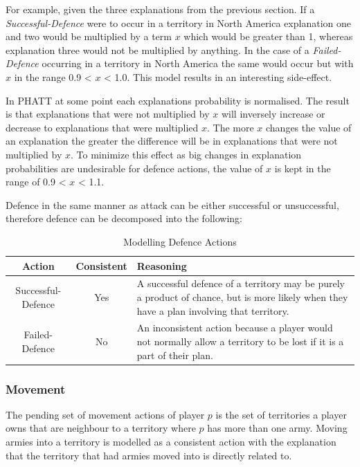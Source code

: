 \documentclass[parskip]{cs4rep}
\begin{document}
For example, given the three explanations from the previous section. If a \textit{Successful-Defence} were to occur in a territory in North America explanation one and two would be multiplied by a term $x$ which would be greater than 1, whereas explanation three would not be multiplied by anything. In the case of a \textit{Failed-Defence} occurring in a territory in North America the same would occur but with $x$ in the range 0.9 < $x$ < 1.0. This model results in an interesting side-effect.

In PHATT at some point each explanations probability is normalised. The result is that explanations that were not multiplied by $x$ will inversely increase or decrease to explanations that were multiplied $x$. The more $x$ changes the value of an explanation the greater the difference will be in explanations that were not multiplied by $x$. To minimize this effect as big changes in explanation probabilities are undesirable for defence actions, the value of $x$ is kept in the range of 0.9 < $x$ < 1.1.

Defence in the same manner as attack can be either successful or unsuccessful, therefore defence can be decomposed into the following: 

\begin{table}[ht]
\centering
\begin{tabular}{|c|c|p{8cm}|}
\hline 
\textbf{Action} & \textbf{Consistent}  & \textbf{Reasoning} \\ 
\hline 
Successful-Defence & Yes & A successful defence of a territory may be purely a product of chance, but is more likely when they have a plan involving that territory. \\ 
\hline 
Failed-Defence & No & An inconsistent action because a player would not normally allow a territory to be lost if it is a part of their plan. \\ 
\hline
\end{tabular}
\caption{Modelling Defence Actions}
\label{table:attack-defend-modelling}
\end{table}

\newpage

\subsubsection{Movement}

The pending set of movement actions of player $p$ is the set of territories a player owns that are neighbour to a territory where $p$ has more than one army. Moving armies into a territory is modelled as a consistent action with the explanation that the territory that had armies moved into is directly related to.
\end{document}
